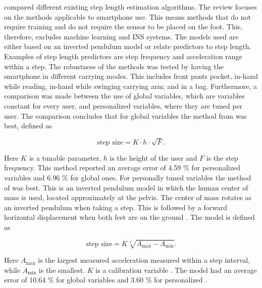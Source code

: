 \citet{Vezocnik2019} compared different existing step length estimation algorithms. The review focuses on the methods applicable to smartphone use. This means methods that do not require training and do not require the sensor to be placed on the foot. This, therefore, excludes machine learning and INS systems. The models used are either based on an inverted pendulum model or relate predictors to step length. Examples of step length predictors are step frequency and acceleration range within a step. The robustness of the methods was tested by having the smartphone in different carrying modes. This includes front pants pocket, in-hand while reading, in-hand while  swinging carrying arm; and in a bag. Furthermore, a comparison was made between the use of global variables, which are variables constant for every user, and personalized variables, where they are tuned per user. The comparison concludes that for global variables the method from \cite{Tian2016} was best, defined as

\begin{equation}
	\label{eq:Tian2016_sle}
	\text{step size} = K \cdot h \cdot \sqrt{F}.
\end{equation}

Here $K$ is a tunable parameter, $h$ is the height of the user and $F$ is the step frequency. This method reported an average error of  4.59 \% for personalized variables and 6.96 \% for global ones. For personally tuned variables the method of \cite{Weinberg2002} was best. This is an inverted pendulum model in which the human center of mass is used, located approximately at the pelvis. The center of mass rotates as an inverted pendulum when taking a step. This is followed by a forward horizontal displacement when both feet are on the ground \cite{Diez2018}. The model is defined as 

\begin{equation}
	\text{step size} =K \sqrt[4]{A_{\max }-A_{\min }}.
	\label{eq:weinberg_stepsize}
\end{equation}

Here $A_{\max}$ is the largest measured acceleration measured within a step interval, while $A_{\min}$ is the smallest. $K$ is a calibration variable  \cite{Weinberg2002,Diez2018}. The model had an average error of  10.64 \% for global variables and  3.60 \% for personalized \cite{Vezocnik2019}.

